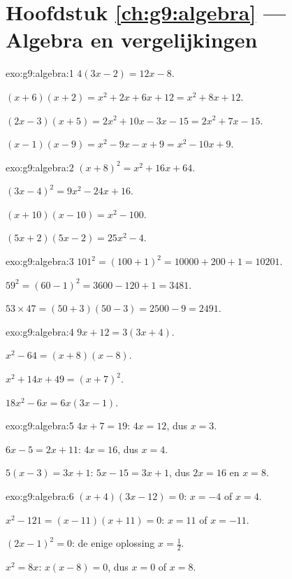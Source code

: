 \section*{Hoofdstuk \ref{ch:g9:algebra} --- Algebra en vergelijkingen}

\begin{solution}{exo:g9:algebra:1}
$4(3x - 2) = 12x - 8$.

$(x+6)(x+2) = x^2 + 2x + 6x + 12 = x^2 + 8x + 12$.

$(2x-3)(x+5) = 2x^2 + 10x - 3x - 15 = 2x^2 + 7x - 15$.

$(x-1)(x-9) = x^2 - 9x - x + 9 = x^2 - 10x + 9$.
\end{solution}

\begin{solution}{exo:g9:algebra:2}
$(x+8)^2 = x^2 + 16x + 64$.

$(3x-4)^2 = 9x^2 - 24x + 16$.

$(x+10)(x-10) = x^2 - 100$.

$(5x+2)(5x-2) = 25x^2 - 4$.
\end{solution}

\begin{solution}{exo:g9:algebra:3}
$101^2 = (100+1)^2 = 10000 + 200 + 1 = 10201$.

$59^2 = (60-1)^2 = 3600 - 120 + 1 = 3481$.

$53 \times 47 = (50+3)(50-3) = 2500 - 9 = 2491$.
\end{solution}

\begin{solution}{exo:g9:algebra:4}
$9x + 12 = 3(3x + 4)$.

$x^2 - 64 = (x+8)(x-8)$.

$x^2 + 14x + 49 = (x+7)^2$.

$18x^2 - 6x = 6x(3x - 1)$.
\end{solution}

\begin{solution}{exo:g9:algebra:5}
$4x + 7 = 19$: $4x = 12$, dus $x = 3$.

$6x - 5 = 2x + 11$: $4x = 16$, dus $x = 4$.

$5(x-3) = 3x + 1$: $5x - 15 = 3x + 1$, dus $2x = 16$ en $x = 8$.
\end{solution}

\begin{solution}{exo:g9:algebra:6}
$(x+4)(3x-12) = 0$: $x = -4$ of $x = 4$.

$x^2 - 121 = (x-11)(x+11) = 0$: $x = 11$ of $x = -11$.

$(2x-1)^2 = 0$: de enige oplossing $x = \frac12$.

$x^2 = 8x$: $x(x - 8) = 0$, dus $x = 0$ of $x = 8$.
\end{solution}

